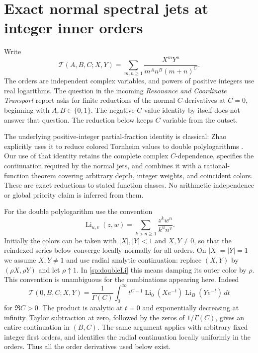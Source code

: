 \section{Exact normal spectral jets at integer inner orders}
\label{sp:sec:normal}

Write
\[
 \mathcal T(A,B,C;X,Y)
 =\sum_{m,n\geq1}\frac{X^mY^n}{m^A n^B(m+n)^C}.
\]
The orders are independent complex variables, and powers of positive
integers use real logarithms.  The question in the incoming
\emph{Resonance and Coordinate Transport} report asks for finite
reductions of the normal $C$-derivatives at $C=0$, beginning with
$A,B\in\{0,1\}$.  The negative-$C$ value identity by itself does not
answer that question.  The reduction below keeps $C$ variable from
the outset.

The underlying positive-integer partial-fraction identity is classical:
Zhao explicitly uses it to reduce colored Tornheim values to double
polylogarithms \cite{sp:Zhao}.  Our use of that identity retains the
complete complex $C$-dependence, specifies the continuation required
by the normal jets, and combines it with a rational-function theorem
covering arbitrary depth, integer weights, and coincident colors.
These are exact reductions to stated function classes.  No arithmetic
independence or global priority claim is inferred from them.

For the double polylogarithm use the convention
\begin{equation}\label{sp:doubleLi}
 \operatorname{Li}_{u,v}(z,w)
   =\sum_{k>n\geq1}\frac{z^k w^n}{k^u n^v}.
\end{equation}
Initially the colors can be taken with $|X|,|Y|<1$ and $X,Y\ne0$,
so that the reindexed series below converge locally normally for all
orders.  On $|X|=|Y|=1$ we assume $X,Y\ne1$ and use radial analytic
continuation: replace $(X,Y)$ by $(\rho X,\rho Y)$ and let
$\rho\uparrow1$.  In \eqref{sp:doubleLi} this means damping its outer
color by $\rho$.  This convention is unambiguous for the combinations
appearing here.  Indeed
\[
 \mathcal T(0,B,C;X,Y)
 =\frac1{\Gamma(C)}\int_0^\infty
 t^{C-1}\operatorname{Li}_0(Xe^{-t})
                    \operatorname{Li}_B(Ye^{-t})\,dt
\]
for $\Re C>0$.  The product is analytic at $t=0$ and exponentially
decreasing at infinity.  Taylor subtraction at zero, followed by the
zeros of $1/\Gamma(C)$, gives an entire continuation in $(B,C)$.
The same argument applies with arbitrary fixed integer first orders,
and identifies the radial continuation locally uniformly in the
orders.  Thus all the order derivatives used below exist.

